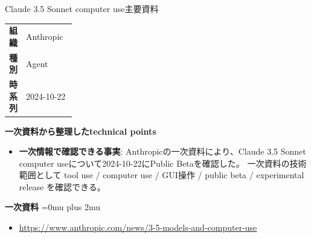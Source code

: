 \begin{technicalnote}{Claude 3.5 Sonnet computer use}{主要資料}
\begingroup
\begin{tabularx}{\linewidth}{@{}>{\bfseries}p{0.22\linewidth}X@{}}
組織 & Anthropic \\
種別 & Agent \\
時系列 & 2024-10-22 \\
\end{tabularx}
\smallskip
{\bfseries 一次資料から整理したtechnical points}
\begin{itemize}[leftmargin=1.5em,itemsep=0.35em]
\item \textbf{一次情報で確認できる事実}: Anthropicの一次資料により、Claude 3.5 Sonnet computer useについて2024-10-22にPublic Betaを確認した。 一次資料の技術範囲として tool use / computer use / GUI操作 / public beta / experimental release を確認できる。
\end{itemize}
\begin{minipage}{\linewidth}
\begin{samepage}
{\bfseries 一次資料}
\begingroup\sloppy
\Urlmuskip=0mu plus 2mu\relax
\begin{itemize}[leftmargin=1.5em,itemsep=0.25em]
\item {\scriptsize\url{https://www.anthropic.com/news/3-5-models-and-computer-use}}
\end{itemize}
\endgroup
\end{samepage}
\end{minipage}
\endgroup
\end{technicalnote}
\medskip

